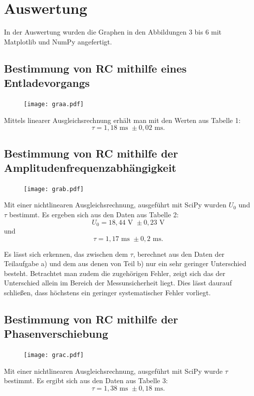 \section{Auswertung}
\label{sec:Auswertung}
In der Auswertung wurden die Graphen in den Abbildungen 3 bis 6 mit Matplotlib \cite{matplotlib} und NumPy \cite{numpy} angefertigt.

\subsection{Bestimmung von RC mithilfe eines Entladevorgangs}
\begin{figure}[H]
	\centering
	\caption{}
	\texttt{[image: graa.pdf]}
	\label{fig:graa}
\end{figure}


Mittels linearer Ausgleichsrechnung erhält man mit den Werten aus Tabelle 1:
\begin{displaymath}
\tau = 1,18 \text{ ms } \pm 0,02 \text{ ms.} 
\end{displaymath}
\subsection{Bestimmung von RC mithilfe der Amplitudenfrequenzabhängigkeit}
\begin{figure}[H]
	\centering
	\caption{}
	\texttt{[image: grab.pdf]}
	\label{fig:grab}
\end{figure}
Mit einer nichtlinearen Ausgleichsrechnung, ausgeführt mit SciPy \cite{scipy} wurden $U_0$ und $\tau$ bestimmt. Es ergeben sich aus den Daten aus Tabelle 2:
\begin{displaymath}
U_0 = 18,44 \text{ V } \pm 0,23 \text{ V}
\end{displaymath}
und
\begin{displaymath}
\tau = 1,17  \text{ ms } \pm 0,2 \text{ ms.}
\end{displaymath}




Es lässt sich erkennen, das zwischen dem $\tau$, berechnet aus den Daten der
 Teilaufgabe a) und dem aus denen von Teil b) nur ein sehr geringer Unterschied
  besteht. Betrachtet man zudem die zugehörigen Fehler, zeigt sich das der
	Unterschied allein im Bereich der Messunsicherheit liegt. Dies lässt daurauf
	 schließen, dass höchstens ein geringer systematischer Fehler vorliegt.

\subsection{Bestimmung von RC mithilfe der Phasenverschiebung}
	 \begin{figure}[H]
	 	\centering
	 	\caption{}
	 	\texttt{[image: grac.pdf]}
	 	\label{fig:grac}
	 \end{figure}
	 
	 Mit einer nichtlinearen Ausgleichsrechnung, ausgeführt mit SciPy \cite{scipy} wurde $\tau$ bestimmt. Es ergibt sich aus den Daten aus Tabelle 3:
	 \begin{displaymath}
	 \tau = 1,38  \text{ ms } \pm 0,18 \text{ ms.}
	 \end{displaymath}
	 


